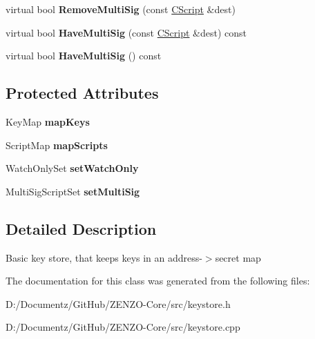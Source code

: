 \begin{DoxyCompactItemize}
\mbox{\label{class_c_basic_key_store_afebb995b8c69e4123bf1962f2de9cc52}} 
virtual bool {\bfseries Remove\+Multi\+Sig} (const \mbox{\hyperlink{class_c_script}{C\+Script}} \&dest)
\item 
\mbox{\label{class_c_basic_key_store_aeed4e62f08102fa2b1f6db4ec07b2bf3}} 
virtual bool {\bfseries Have\+Multi\+Sig} (const \mbox{\hyperlink{class_c_script}{C\+Script}} \&dest) const
\item 
\mbox{\label{class_c_basic_key_store_a5ad58081dedd56a2706b8dcca96460d0}} 
virtual bool {\bfseries Have\+Multi\+Sig} () const
\end{DoxyCompactItemize}
\subsection*{Protected Attributes}
\begin{DoxyCompactItemize}
\item 
\mbox{\label{class_c_basic_key_store_ac520003e5c3d863bf71fde247c6e0672}} 
Key\+Map {\bfseries map\+Keys}
\item 
\mbox{\label{class_c_basic_key_store_a8e9fa81382129c1535a0ee7b0d9c8f3b}} 
Script\+Map {\bfseries map\+Scripts}
\item 
\mbox{\label{class_c_basic_key_store_ac3391cb491e315403ad9af6afd1313da}} 
Watch\+Only\+Set {\bfseries set\+Watch\+Only}
\item 
\mbox{\label{class_c_basic_key_store_abf343356a152df521b10941b8daa72cf}} 
Multi\+Sig\+Script\+Set {\bfseries set\+Multi\+Sig}
\end{DoxyCompactItemize}


\subsection{Detailed Description}
Basic key store, that keeps keys in an address-\/$>$secret map 

The documentation for this class was generated from the following files\+:\begin{DoxyCompactItemize}
\item 
D\+:/\+Documentz/\+Git\+Hub/\+Z\+E\+N\+Z\+O-\/\+Core/src/keystore.\+h\item 
D\+:/\+Documentz/\+Git\+Hub/\+Z\+E\+N\+Z\+O-\/\+Core/src/keystore.\+cpp\end{DoxyCompactItemize}
